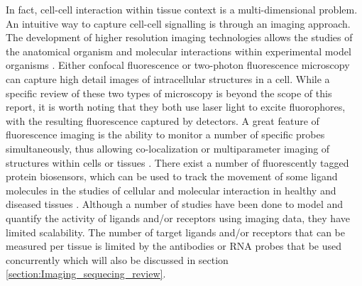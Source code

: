 In fact, cell-cell interaction within tissue context is a multi-dimensional problem. An intuitive way to capture cell-cell signalling is through an imaging approach. The development of higher resolution imaging technologies allows the studies of the anatomical organism and molecular interactions within experimental model organisms \cite{osswald2013insights}. Either confocal fluorescence or two-photon fluorescence microscopy can capture high detail images of intracellular structures in a cell. While a specific review of these two types of microscopy is beyond the scope of this report, it is worth noting that they both use laser light to excite fluorophores, with the resulting fluorescence captured by detectors. A great feature of fluorescence imaging is the ability to monitor a number of specific probes simultaneously, thus allowing co-localization or multiparameter imaging of structures within cells or tissues \cite{periasamy2013methods}. There exist a number of fluorescently tagged protein biosensors, which can be used to track the movement of some ligand molecules in the studies of cellular and molecular interaction in healthy and diseased tissues \cite{gerdes2013cell}. Although a number of studies have been done to model and quantify the activity of ligands and/or receptors \cite{awaji1998real, go1997quantitative, maamra1999studies, sneddon2003activation, bohme2009illuminating} using imaging data, they have limited scalability. The number of target ligands and/or receptors that can be measured per tissue is limited by the antibodies or RNA probes that be used concurrently which will also be discussed in section \ref{section:Imaging_sequecing_review}. 


